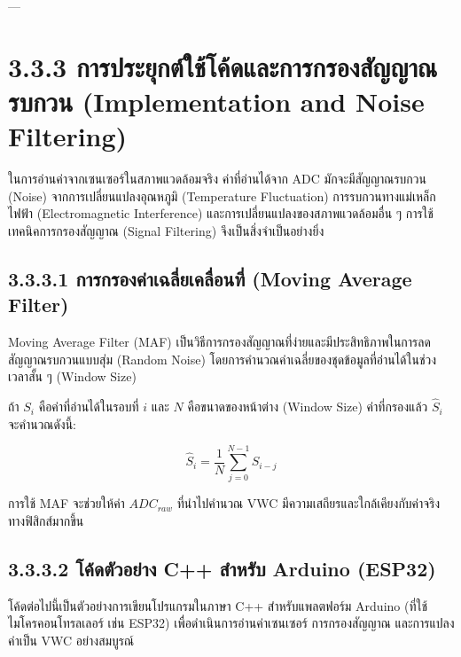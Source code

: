 \documentclass[11pt,a4paper,openany]{report}
\begin{document}
---

\section{3.3.3 การประยุกต์ใช้โค้ดและการกรองสัญญาณรบกวน (Implementation and Noise Filtering)}


ในการอ่านค่าจากเซนเซอร์ในสภาพแวดล้อมจริง ค่าที่อ่านได้จาก ADC มักจะมีสัญญาณรบกวน (Noise) จากการเปลี่ยนแปลงอุณหภูมิ (Temperature Fluctuation) การรบกวนทางแม่เหล็กไฟฟ้า (Electromagnetic Interference) และการเปลี่ยนแปลงของสภาพแวดล้อมอื่น ๆ การใช้เทคนิคการกรองสัญญาณ (Signal Filtering) จึงเป็นสิ่งจำเป็นอย่างยิ่ง

\subsection{3.3.3.1 การกรองค่าเฉลี่ยเคลื่อนที่ (Moving Average Filter)}


Moving Average Filter (MAF) เป็นวิธีการกรองสัญญาณที่ง่ายและมีประสิทธิภาพในการลดสัญญาณรบกวนแบบสุ่ม (Random Noise) โดยการคำนวณค่าเฉลี่ยของชุดข้อมูลที่อ่านได้ในช่วงเวลาสั้น ๆ (Window Size)

ถ้า $S_i$ คือค่าที่อ่านได้ในรอบที่ $i$ และ $N$ คือขนาดของหน้าต่าง (Window Size) ค่าที่กรองแล้ว $\hat{S}_i$ จะคำนวณดังนี้:

$$\hat{S}_i = \frac{1}{N} \sum_{j=0}^{N-1} S_{i-j}$$


การใช้ MAF จะช่วยให้ค่า $ADC_{raw}$ ที่นำไปคำนวณ VWC มีความเสถียรและใกล้เคียงกับค่าจริงทางฟิสิกส์มากขึ้น

\subsection{3.3.3.2 โค้ดตัวอย่าง C++ สำหรับ Arduino (ESP32)}


โค้ดต่อไปนี้เป็นตัวอย่างการเขียนโปรแกรมในภาษา C++ สำหรับแพลตฟอร์ม Arduino (ที่ใช้ไมโครคอนโทรลเลอร์ เช่น ESP32) เพื่อดำเนินการอ่านค่าเซนเซอร์ การกรองสัญญาณ และการแปลงค่าเป็น VWC อย่างสมบูรณ์
\end{document}
